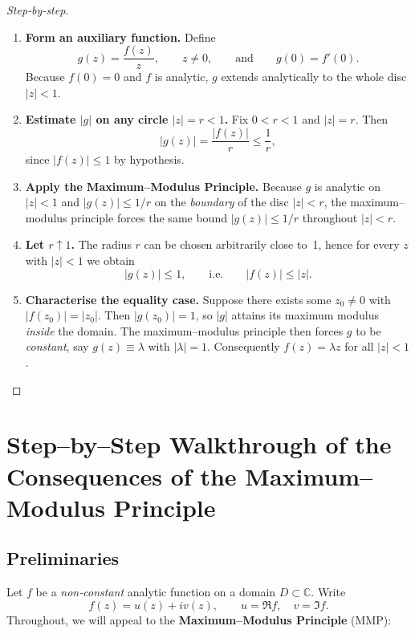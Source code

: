 \documentclass[12pt]{article}
\theoremstyle{definition} %
\theoremstyle{plain} %
\begin{document}
  \begin{proof}[Step‑by‑step]
  \begin{enumerate}
    \item \textbf{Form an auxiliary function.}\;
          Define
          \[
                g(z)=\frac{f(z)}{z}, \qquad z\neq0,\qquad\text{and}\qquad
                g(0)=f'(0).
          \]
          Because $f(0)=0$ and $f$ is analytic, $g$ extends analytically
          to the whole disc $|z|<1$.
  
    \item \textbf{Estimate $|g|$ on any circle $|z|=r<1$.}\;
          Fix $0<r<1$ and $|z|=r$.  Then
          \[
              |g(z)|
              =\frac{|f(z)|}{r}
              \le\frac{1}{r},
          \]
          since $|f(z)|\le1$ by hypothesis.
  
    \item \textbf{Apply the Maximum–Modulus Principle.}\;
          Because $g$ is analytic on $|z|<1$ and
          $|g(z)|\le 1/r$ on the \emph{boundary} of the disc $|z|<r$,
          the maximum–modulus principle forces the same bound
          \(
              |g(z)|\le 1/r
          \)
          throughout \(|z|<r\).
  
    \item \textbf{Let $r\uparrow1$.}\;
          The radius $r$ can be chosen arbitrarily close to 1,
          hence for every $z$ with $|z|<1$ we obtain
          \[
                |g(z)|\le1,
                \qquad\text{i.e.}\qquad
                |f(z)|\le |z|.
          \]
  
    \item \textbf{Characterise the equality case.}\;
          Suppose there exists some $z_0\ne0$ with $|f(z_0)|=|z_0|$.
          Then $|g(z_0)|=1$, so $|g|$ attains its maximum modulus
          \emph{inside} the domain.
          The maximum–modulus principle then forces $g$ to be
          \emph{constant}, say $g(z)\equiv\lambda$ with
          $|\lambda|=1$.  Consequently $f(z)=\lambda z$ for all $|z|<1$.
  \end{enumerate}
  \end{proof}

  \section*{Step--by--Step Walkthrough of the Consequences of the Maximum--Modulus Principle}

\subsection*{Preliminaries}
Let $f$ be a \emph{non‑constant} analytic function on a domain $D\subset\mathbb{C}$.  
Write
\[
f(z)=u(z)+iv(z),\qquad u=\Re f,\quad v=\Im f .
\]
Throughout, we will appeal to the \textbf{Maximum–Modulus Principle} (MMP):
\end{document}
